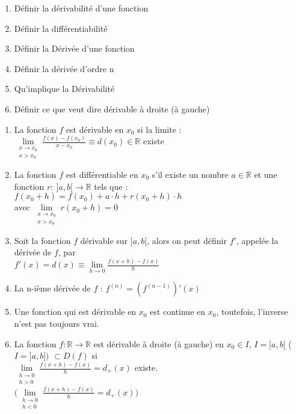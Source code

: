 \documentclass[12pt]{article}
\newcommand*{\xfield}[1]{\begin{mdframed}\centering #1\end{mdframed}\bigskip}
\newenvironment{note}{}{}
\begin{document}
\begin{note}
	\xfield{\begin{enumerate}
		\item Définir la dérivabilité d'une fonction
		\item Définir la différentiabilité
		\item Définir la Dérivée d'une fonction
		\item Définir la dérivée d'ordre n
		\item Qu'implique la Dérivabilité
		\item Définir ce que veut dire dérivable à droite (à gauche)
	\end{enumerate} }
	\xfield{\begin{enumerate}
		\item La fonction $f$ est dérivable en $x_0$ si la limite :\\
			$\lim\limits_{\substack{x\to x_0\\x > x_0}} \frac{f(x)-f(x_0)}{x-x_0} \equiv d(x_0) \in \mathbb{R}$ existe
		\item La fonction $f$ est différentiable en $x_0$ s'il existe un nombre $a \in \mathbb{R}$ et une fonction $r:\ ]a,b[ \to \mathbb{R}$ tels que :\\
		$f(x_0 + h) = f(x_0) + a \cdot h + r(x_0 + h) \cdot h$\\
		avec $\lim\limits_{\substack{x\to x_0\\x > x_0}} r(x_0+h) = 0$
		\item Soit la fonction $f$ dérivable sur $]a,b[$, alors on peut définir $f'$, appelée la dérivée de $f$, par \\
		$f'(x) = d(x) \equiv \lim\limits_{h \to 0} \frac{f(x+h)-f(x)}{h}$
		\item La n-ième dérivée de $f$ : $f^{(n)} = (f^{(n-1)})'(x)$
		\item Une fonction qui est dérivable en $x_0$ est continue en $x_0$, toutefois, l'inverse n'est pas toujours vrai.
		\item La fonction $f : \mathbb{R} \rightarrow \mathbb{R}$ est dérivable à droite (à gauche) en $x_0 \in I$, $I = [a,b[$  ($I = ]a,b])$ $\subset D(f)$ si \\
		$\lim\limits_{\substack{h \to 0\\ h > 0}} \frac{f(x+h)-f(x)}{h} = d_+(x)$ existe.\\
		$\big(\lim\limits_{\substack{h \to 0\\ h < 0}} \frac{f(x+h)-f(x)}{h} = d_+(x)\big)$
	\end{enumerate} }
\end{note}
\end{document}
